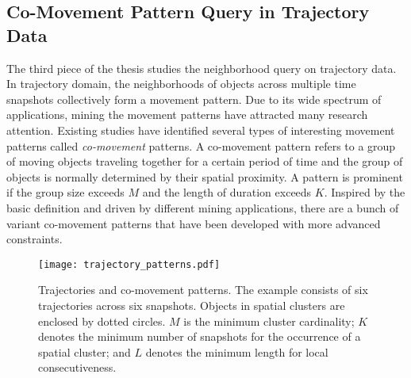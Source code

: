 \subsection{Co-Movement Pattern Query in Trajectory Data}
The third piece of the thesis studies the neighborhood
query on trajectory data. In trajectory domain, the neighborhoods of objects across multiple time snapshots collectively form a movement pattern. Due to its wide spectrum of applications, mining the movement patterns have attracted many research attention.
%
%
%
%
Existing studies have identified several types of interesting movement patterns called \emph{co-movement} patterns. A co-movement pattern refers to a group of moving objects traveling together for a certain period of time and the group of objects is normally determined by their spatial proximity. A pattern is prominent if the group size exceeds $M$ and the length of duration exceeds $K$. 
Inspired by the basic definition 
and driven by different mining applications, there are a bunch of variant 
co-movement patterns that have been developed with more advanced constraints.

\begin{figure}[h]
\centering
\texttt{[image: trajectory\_patterns.pdf]}
\caption{Trajectories and co-movement patterns. The example consists of six trajectories across six snapshots. Objects in spatial clusters are enclosed by dotted circles. $M$ is the minimum cluster cardinality; $K$ denotes the minimum number of snapshots for the occurrence of a spatial cluster; and $L$ denotes the minimum length for local consecutiveness.}
\label{fig:related_work}
\end{figure}

